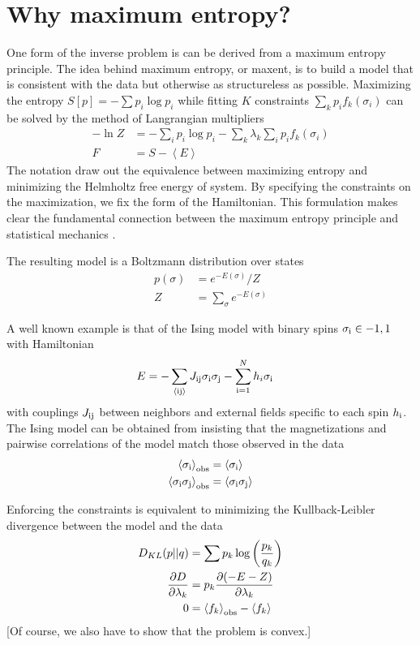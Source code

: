 \documentclass[11pt]{amsart}
\newcommand{\br}[1]{\left<#1\right>}
\newcommand{\si}[0]{\sigma_{\rm i}}
\newcommand{\sj}[0]{\sigma_{\rm j}}
\begin{document}
\section{Why maximum entropy?}
One form of the inverse problem is can be derived from a maximum entropy principle. The idea behind maximum entropy, or maxent, is to build a model that is consistent with the data but otherwise as structureless as possible. Maximizing the entropy $S[p] = -\sum p_i \log p_i$ while fitting $K$ constraints $\sum_k p_i f_k(\sigma_i)$ can be solved by the method of Langrangian multipliers
\begin{align}
	-\ln Z &= -\sum_i p_i\log p_i - \sum_k \lambda_k \sum_i p_i f_k(\sigma_i)\\
	F &= S - \br{E}
\end{align}
The notation draw out the equivalence between maximizing entropy and minimizing the Helmholtz free energy of system. By specifying the constraints on the maximization, we fix the form of the Hamiltonian. This formulation makes clear the fundamental connection between the maximum entropy principle and statistical mechanics \cite{Jaynes}.

The resulting model is a Boltzmann distribution over states
\begin{align}
	p(\sigma) &= e^{-E(\sigma)}/Z\\
	Z &= \sum_\sigma e^{-E(\sigma)}
\end{align}

A well known example is that of the Ising model with binary spins $\sigma_{\rm i} \in {-1,1}$ with Hamiltonian 
\begin{align}
	E &= -\sum_{\br{\rm ij}} J_{\rm ij}\si\sj -\sum_{\rm i=1}^N h_i\si
\end{align}
with couplings $J_{\rm ij}$ between neighbors and external fields specific to each spin $h_{\rm i}$. The Ising model can be obtained from insisting that the magnetizations and pairwise correlations of the model match those observed in the data
\begin{align}
	\br{\si}_{\rm obs} &= \br{\si}\\
	\br{\si\sj}_{\rm obs} &= \br{\si\sj}
\end{align}

Enforcing the constraints is equivalent to minimizing the Kullback-Leibler divergence between the model and the data
\begin{align}
	D_{KL}(p||q) &= \sum p_k \log\left(\frac{p_k}{q_k}\right)\\
	\frac{\partial D}{\partial \lambda_k} &= p_k \frac{\partial (-E-Z)}{\partial \lambda_k}\\
	0 &= \br{f_k}_{\rm obs} -\br{f_k}
\end{align}
[Of course, we also have to show that the problem is convex.]
\end{document}

